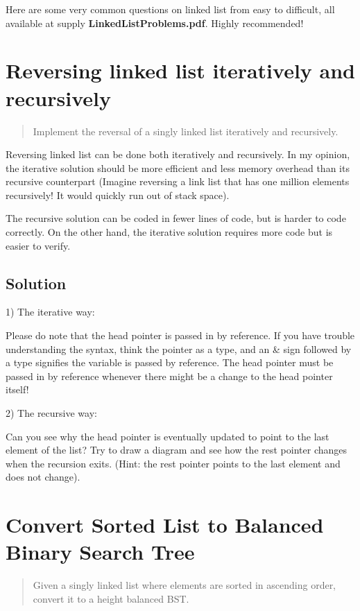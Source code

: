 \documentclass[12pt, reqno, oneside]{amsart}
\begin{document}
Here are some very common questions on linked list from easy to difficult, all available at supply \textbf{LinkedListProblems.pdf}. Highly recommended!


\section{Reversing linked list iteratively and recursively}
\begin{framed}
\begin{quote}
Implement the reversal of a singly linked list iteratively and recursively.
\end{quote}
\end{framed}

Reversing linked list can be done both iteratively and recursively. In my opinion, the iterative solution should be more efficient and less memory overhead than its recursive counterpart (Imagine reversing a link list that has one million elements recursively! It would quickly run out of stack space).

The recursive solution can be coded in fewer lines of code, but is harder to code correctly. On the other hand, the iterative solution requires more code but is easier to verify.

\subsection{Solution}
1) The iterative way:


Please do note that the head pointer is passed in by reference. If you have trouble understanding the syntax, think the pointer as a type, and an \& sign followed by a type signifies the variable is passed by reference. The head pointer must be passed in by reference whenever there might be a change to the head pointer itself!\newline

2) The recursive way:

Can you see why the head pointer is eventually updated to point to the last element of the list? Try to draw a diagram and see how the rest pointer changes when the recursion exits. (Hint: the rest pointer points to the last element and does not change).


\section{Convert Sorted List to Balanced Binary Search Tree }
\begin{framed}
\begin{quotation}
Given a singly linked list where elements are sorted in ascending order, convert it to a height balanced BST.
\end{quotation}
\end{framed}
\end{document}
